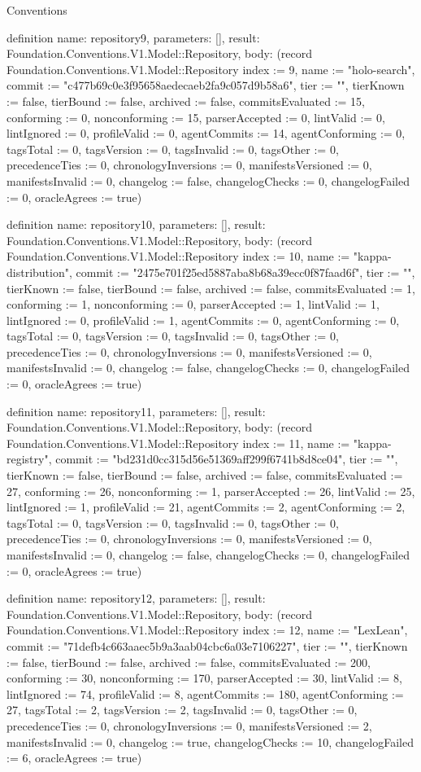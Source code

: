 \begin{lexlean}{Conventions}
\begin{semanticmodule}
definition{
  name: repository9,
  parameters: [],
  result: Foundation.Conventions.V1.Model::Repository,
  body: (record Foundation.Conventions.V1.Model::Repository {index := 9, name := "holo-search", commit := "c477b69c0e3f95658aedecaeb2fa9c057d9b58a6", tier := "", tierKnown := false, tierBound := false, archived := false, commitsEvaluated := 15, conforming := 0, nonconforming := 15, parserAccepted := 0, lintValid := 0, lintIgnored := 0, profileValid := 0, agentCommits := 14, agentConforming := 0, tagsTotal := 0, tagsVersion := 0, tagsInvalid := 0, tagsOther := 0, precedenceTies := 0, chronologyInversions := 0, manifestsVersioned := 0, manifestsInvalid := 0, changelog := false, changelogChecks := 0, changelogFailed := 0, oracleAgrees := true})
}

definition{
  name: repository10,
  parameters: [],
  result: Foundation.Conventions.V1.Model::Repository,
  body: (record Foundation.Conventions.V1.Model::Repository {index := 10, name := "kappa-distribution", commit := "2475e701f25ed5887aba8b68a39ecc0f87faad6f", tier := "", tierKnown := false, tierBound := false, archived := false, commitsEvaluated := 1, conforming := 1, nonconforming := 0, parserAccepted := 1, lintValid := 1, lintIgnored := 0, profileValid := 1, agentCommits := 0, agentConforming := 0, tagsTotal := 0, tagsVersion := 0, tagsInvalid := 0, tagsOther := 0, precedenceTies := 0, chronologyInversions := 0, manifestsVersioned := 0, manifestsInvalid := 0, changelog := false, changelogChecks := 0, changelogFailed := 0, oracleAgrees := true})
}

definition{
  name: repository11,
  parameters: [],
  result: Foundation.Conventions.V1.Model::Repository,
  body: (record Foundation.Conventions.V1.Model::Repository {index := 11, name := "kappa-registry", commit := "bd231d0cc315d56e51369aff299f6741b8d8ce04", tier := "", tierKnown := false, tierBound := false, archived := false, commitsEvaluated := 27, conforming := 26, nonconforming := 1, parserAccepted := 26, lintValid := 25, lintIgnored := 1, profileValid := 21, agentCommits := 2, agentConforming := 2, tagsTotal := 0, tagsVersion := 0, tagsInvalid := 0, tagsOther := 0, precedenceTies := 0, chronologyInversions := 0, manifestsVersioned := 0, manifestsInvalid := 0, changelog := false, changelogChecks := 0, changelogFailed := 0, oracleAgrees := true})
}

definition{
  name: repository12,
  parameters: [],
  result: Foundation.Conventions.V1.Model::Repository,
  body: (record Foundation.Conventions.V1.Model::Repository {index := 12, name := "LexLean", commit := "71defb4c663aaec5b9a3aab04cbc6a03e7106227", tier := "", tierKnown := false, tierBound := false, archived := false, commitsEvaluated := 200, conforming := 30, nonconforming := 170, parserAccepted := 30, lintValid := 8, lintIgnored := 74, profileValid := 8, agentCommits := 180, agentConforming := 27, tagsTotal := 2, tagsVersion := 2, tagsInvalid := 0, tagsOther := 0, precedenceTies := 0, chronologyInversions := 0, manifestsVersioned := 2, manifestsInvalid := 0, changelog := true, changelogChecks := 10, changelogFailed := 6, oracleAgrees := true})
}


\end{semanticmodule}
\end{lexlean}
